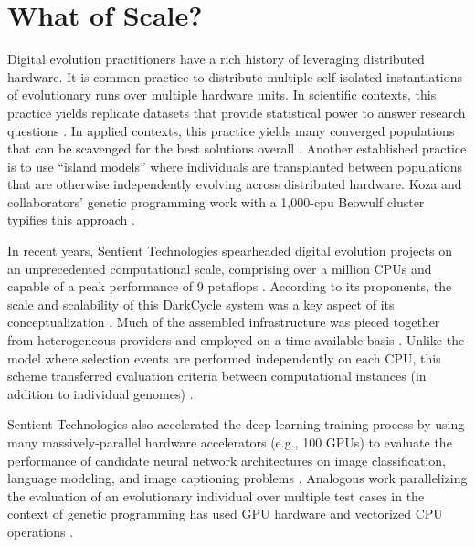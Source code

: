\section{What of Scale?}

Digital evolution practitioners have a rich history of leveraging distributed hardware.
It is common practice to distribute multiple self-isolated instantiations of evolutionary runs over multiple hardware units.
In scientific contexts, this practice yields replicate datasets that provide statistical power to answer research questions \citep{dolson2017spatial}.
In applied contexts, this practice yields many converged populations that can be scavenged for the best solutions overall \citep{hornby2006automated}.
Another established practice is to use ``island models'' where individuals are transplanted between populations that are otherwise independently evolving across distributed hardware.
Koza and collaborators’ genetic programming work with a 1,000-cpu Beowulf cluster typifies this approach \citep{bennett1999building}.

In recent years, Sentient Technologies spearheaded digital evolution projects on an unprecedented computational scale, comprising over a million CPUs and capable of a peak performance of 9 petaflops \citep{miikkulainen2019evolving}.
According to its proponents, the scale and scalability of this DarkCycle system was a key aspect of its conceptualization \citep{gilbert2015artificial}.
Much of the assembled infrastructure was pieced together from heterogeneous providers and employed on a time-available basis \citep{blondeau2009distributed}.
Unlike the  model where selection events are performed independently on each CPU, this scheme transferred evaluation criteria between computational instances (in addition to individual genomes) \citep{hodjat2013distributed}.

Sentient Technologies also accelerated the deep learning training process by using many massively-parallel hardware accelerators (e.g., 100 GPUs) to evaluate the performance of candidate neural network architectures on image classification, language modeling, and image captioning problems \citep{miikkulainen2019evolving}.
Analogous work parallelizing the evaluation of an evolutionary individual over multiple test cases in the context of genetic programming has used GPU hardware and vectorized CPU operations
\citep{harding2007fast_springer, langdon2019continuous}.

